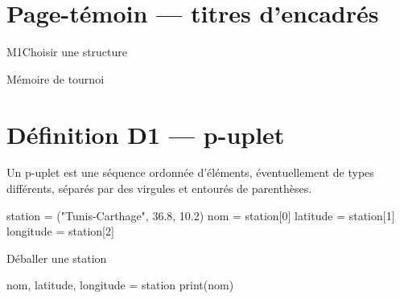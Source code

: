 \documentclass{gabarits/nexus-manuel}
\begin{document}

\section*{Page-témoin — titres d'encadrés}
\begin{nxdef}[D1]\end{nxdef}
\begin{nxthm}[T1]\end{nxthm}
\begin{nxprop}[P1]\end{nxprop}
\begin{nxerr}\end{nxerr}
\begin{fmbox}{M1}{Choisir une structure}\end{fmbox}
\begin{nxstar}\end{nxstar}
\begin{nxcard}\end{nxcard}
\begin{mpbox}{Mémoire de tournoi}\end{mpbox}
\clearpage

\section*{Définition D1 — p-uplet}
\begin{nxdef}[D1]
Un p-uplet est une séquence ordonnée d'éléments, éventuellement de types différents,
séparés par des virgules et entourés de parenthèses.
\end{nxdef}
\begin{python}
station = ("Tunis-Carthage", 36.8, 10.2)
nom = station[0]
latitude = station[1]
longitude = station[2]
\end{python}
\begin{codereference}{Déballer une station}
\begin{python}
nom, latitude, longitude = station
print(nom)
\end{python}
\end{codereference}
\begin{center}\end{center}
\clearpage
\end{document}
